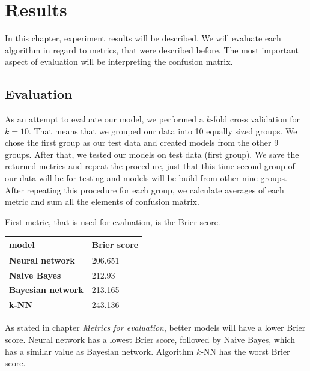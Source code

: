 \documentclass[conference]{IEEEtran}
\begin{document}

\section{Results}

In this chapter, experiment results will be described. We will evaluate each algorithm
in regard to metrics, that were described before. The most important aspect of evaluation
will be interpreting the confusion matrix.

\subsection{Evaluation}

As an attempt to evaluate our model, we performed a $k$-fold cross validation
for $k=10$. That means that we grouped our data into 10 equally sized groups. We 
chose the first group as our test data and created models from the other 9 
groups. After that, we tested our models on test data (first group). We save the
returned metrics and repeat the procedure, just that this time second group of our data 
will be for testing and models will be build from other nine groups. After repeating this
procedure for each group, we calculate averages of each metric and sum all the elements
of confusion matrix. 

First metric, that is used for evaluation, is the Brier score. 

\begin{table}[!ht]
    \centering
    \begin{tabular}{ll}
        model & Brier score \\ \hline
        \textbf{Neural network} & 206.651 \\ 
        \textbf{Naive Bayes} & 212.93 \\ 
        \textbf{Bayesian network} & 213.165 \\ 
        \textbf{k-NN} & 243.136 \\ 
    \end{tabular}
\end{table}

As stated in chapter \textit{Metrics for evaluation}, better models will have a lower Brier score.
Neural network has a lowest Brier score, followed by Naive Bayes, which has a similar
value as Bayesian network. Algorithm $k$-NN has the worst Brier score.
\end{document}
